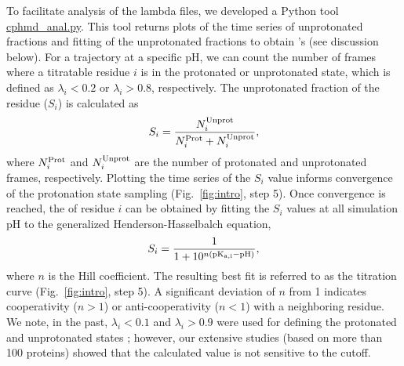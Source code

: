 To facilitate analysis of the lambda files, we developed a Python tool \href{https://gitlab.com/shenlab-amber-cphmd/cphmd-analysis}{cphmd\_anal.py}. 
This tool returns plots of the time series of unprotonated fractions and 
fitting of the unprotonated fractions to obtain {\pka's} (see discussion below).
For a trajectory at a specific pH, 
we can count the number of frames where a titratable residue $i$ is 
in the protonated or unprotonated state, which is defined 
as $\lambda_i < 0.2$ or $\lambda_i > 0.8$, respectively.
The unprotonated fraction of the residue ($S_i$)
is calculated as
\begin{equation}
S_i = \frac{N_i^{\rm Unprot}}{N_i^{\rm Prot} + N_i^{\rm Unprot}},
\end{equation}
where $N_i^{\rm Prot}$ and $N_i^{\rm Unprot}$ are
the number of protonated and unprotonated frames,
respectively.
Plotting the time series of the $S_i$ value informs
convergence of the protonation state sampling (Fig.~\ref{fig:intro}, step 5).
Once convergence is reached, the {\pka} of residue $i$
can be obtained by fitting the $S_i$ 
values at all simulation pH to 
the generalized Henderson-Hasselbalch equation,
\begin{equation}
S_i = \frac{1}{1+10^{n(\rm pK_{a,i} - pH)}},
\end{equation}
where $n$ is the Hill coefficient.
The resulting best fit is referred to as the titration curve (Fig.~\ref{fig:intro}, step 5).
A significant deviation of $n$ from 1 indicates cooperativity
($n>1$)
or anti-cooperativity ($n<1$) with a neighboring residue.
We note, in the past, $\lambda_i < 0.1$ and $\lambda_i > 0.9$ were used for
defining the protonated and unprotonated states \cite{Khandogin_Brooks_2005_Biophys.J.,Khandogin_Brooks_2006_Biochemistry}; 
however, our extensive studies (based on more than 100 proteins) showed 
that the calculated {\pka} value is not sensitive to the cutoff.

